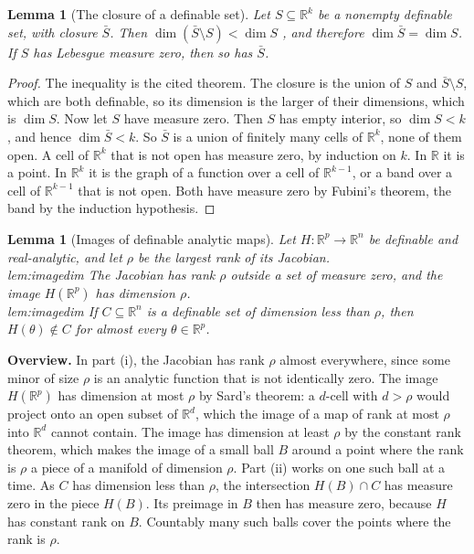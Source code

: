 \documentclass[10pt]{article}
\newtheorem{lemma}[theorem]{Lemma}
\theoremstyle{definition}
\theoremstyle{remark}
\newcommand{\R}{\mathbb{R}}
\newcommand{\para}[1]{\smallskip\noindent\textbf{#1}\hspace{0.5em}}
\newcommand{\ptlabel}[1]{\phantomsection\label{#1}}
\newcommand{\stpart}[3]{\ifx\relax#1\relax\else\ptlabel{#1:#2}\fi{\upshape\bfseries\boldmath(#2)\ifx\relax#3\relax\else\ #3.\fi}}
\begin{document}
\begin{lemma}[The closure of a definable set]\label{lem:closure}
Let $S \subseteq \R^k$ be a nonempty definable set, with closure $\bar S$. Then $\dim(\bar S \setminus S) < \dim S$ \citep[Chapter~4, Theorem~(1.8)]{vandendries1998tame}, and therefore $\dim\bar S = \dim S$. If $S$ has Lebesgue measure zero, then so has $\bar S$.
\end{lemma}

\begin{proof}
The inequality is the cited theorem. The closure is the union of $S$ and $\bar S \setminus S$, which are both definable, so its dimension is the larger of their dimensions, which is $\dim S$. Now let $S$ have measure zero. Then $S$ has empty interior, so $\dim S < k$, and hence $\dim\bar S < k$. So $\bar S$ is a union of finitely many cells of $\R^k$, none of them open. A cell of $\R^k$ that is not open has measure zero, by induction on $k$. In $\R$ it is a point. In $\R^k$ it is the graph of a function over a cell of $\R^{k-1}$, or a band over a cell of $\R^{k-1}$ that is not open. Both have measure zero by Fubini's theorem, the band by the induction hypothesis.
\end{proof}

\begin{lemma}[Images of definable analytic maps]\label{lem:imagedim}
Let $H : \R^p \to \R^n$ be definable and real-analytic, and let $\rho$ be the largest rank of its Jacobian.\\
\stpart{lem:imagedim}{i}{} The Jacobian has rank $\rho$ outside a set of measure zero, and the image $H(\R^p)$ has dimension $\rho$.\\
\stpart{lem:imagedim}{ii}{} If $C \subseteq \R^n$ is a definable set of dimension less than $\rho$, then $H(\theta) \notin C$ for almost every $\theta \in \R^p$.
\end{lemma}

\para{Overview.} In part (i), the Jacobian has rank $\rho$ almost everywhere, since some minor of size $\rho$ is an analytic function that is not identically zero. The image $H(\R^p)$ has dimension at most $\rho$ by Sard's theorem: a $d$-cell with $d > \rho$ would project onto an open subset of $\R^d$, which the image of a map of rank at most $\rho$ into $\R^d$ cannot contain. The image has dimension at least $\rho$ by the constant rank theorem, which makes the image of a small ball $B$ around a point where the rank is $\rho$ a piece of a manifold of dimension $\rho$. Part (ii) works on one such ball at a time. As $C$ has dimension less than $\rho$, the intersection $H(B) \cap C$ has measure zero in the piece $H(B)$. Its preimage in $B$ then has measure zero, because $H$ has constant rank on $B$. Countably many such balls cover the points where the rank is $\rho$.
\end{document}
